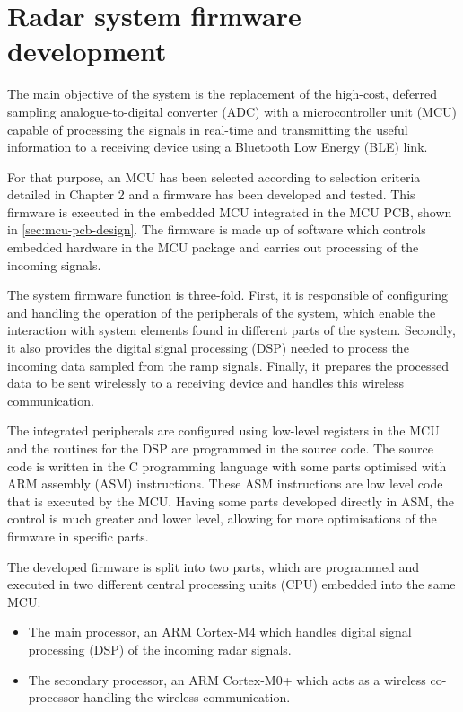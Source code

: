 \chapter{Radar system firmware development}\label{sec:radar-system-firmware-development}
The main objective of the system is the replacement of the high-cost, deferred sampling analogue-to-digital converter (ADC) with a microcontroller unit (MCU) capable of processing the signals in real-time and transmitting the useful information to a receiving device using a Bluetooth Low Energy (BLE) link.

For that purpose, an MCU has been selected according to selection criteria detailed in Chapter 2 and a firmware has been developed and tested. This firmware is executed in the embedded MCU integrated in the MCU PCB, shown in \cref{sec:mcu-pcb-design}.
The firmware is made up of software which controls embedded hardware in the MCU package and carries out processing of the incoming signals.

The system firmware function is three-fold. First, it is responsible of configuring and handling the operation of the peripherals of the system, which enable the interaction with system elements found in different parts of the system. Secondly, it also provides the digital signal processing (DSP) needed to process the incoming data sampled from the ramp signals. Finally, it prepares the processed data to be sent wirelessly to a receiving device and handles this wireless communication.

The integrated peripherals are configured using low-level registers in the MCU \cite{STMicroelectronics2022, STMicroelectronics2022a} and the routines for the DSP are programmed in the source code. The source code is written in the C programming language with some parts optimised with ARM assembly (ASM) instructions. These ASM instructions are low level code that is executed by the MCU. Having some parts developed directly in ASM, the control is much greater and lower level, allowing for more optimisations of the firmware in specific parts.

The developed firmware is split into two parts, which are programmed and executed in two different central processing units (CPU) embedded into the same MCU:
\begin{itemize}
	\item The main processor, an ARM Cortex-M4 \cite{ARMM4} which handles digital signal processing (DSP) of the incoming radar signals.
	\item The secondary processor, an ARM Cortex-M0+ \cite{ARMM0} which acts as a wireless co-processor handling the wireless communication.
\end{itemize}

